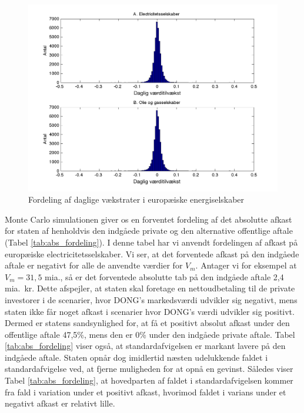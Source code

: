 \documentclass{article}
\begin{document}
\begin{figure}
\includegraphics[scale=0.8]{../matlab/figs/data_hist_guan}
\caption{Fordeling af daglige v\ae{}kstrater i europ\ae{}iske energiselskaber}
\label{fig:data_hist}
\end{figure}

Monte Carlo simulationen giver os en forventet fordeling af det absolutte afkast for staten af henholdvis den indgåede private og den alternative offentlige aftale (Tabel \ref{tab:abs_fordeling}). I denne tabel har vi anvendt fordelingen af afkast på europæiske electricitetsselskaber. Vi ser, at det forventede afkast på den indgåede aftale er negativt for alle de anvendte værdier for $V_m$. Antager vi for eksempel at $V_m=31{,}5$ mia., så er det forventede absolutte tab på den indgåede aftale 2,4 mia.\ kr. Dette afspejler, at staten skal foretage en nettoudbetaling til de private investorer i de scenarier, hvor DONG's markedsværdi udvikler sig negativt, mens staten ikke får noget afkast i scenarier hvor DONG's værdi udvikler sig positivt. Dermed er statens sandsynlighed for, at få et positivt absolut afkast under den offentlige aftale 47,5\%, mens den er 0\% under den indgåede private aftale. Tabel \ref{tab:abs_fordeling} viser også, at standardafvigelsen er markant lavere på den indgåede aftale. Staten opnår dog imidlertid næsten udelukkende faldet i standardafvigelse ved, at fjerne muligheden for at opnå en gevinst. Således viser Tabel \ref{tab:abs_fordeling}, at hovedparten af faldet i standardafvigelsen kommer fra fald i variation under et positivt afkast, hvorimod faldet i varians under et negativt afkast er relativt lille.
\end{document}
